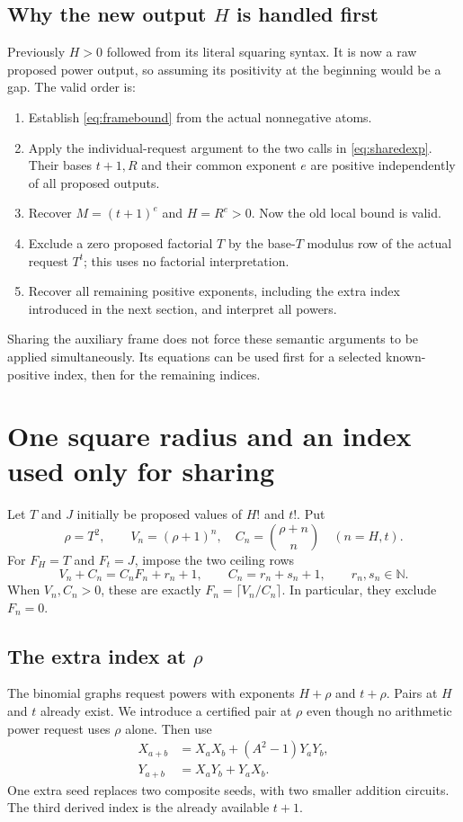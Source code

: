 \documentclass[11pt]{article}
\theoremstyle{definition}\newtheorem{definition}[theorem]{Definition}
\newcommand{\N}{\mathbb N}\newcommand{\Z}{\mathbb Z}\newcommand{\Q}{\mathbb Q}
\begin{document}
\subsection{Why the new output \texorpdfstring{$H$}{H} is handled first}
Previously $H>0$ followed from its literal squaring syntax. It is now a
raw proposed power output, so assuming its positivity at the beginning
would be a gap. The valid order is:
\begin{enumerate}
\item Establish \eqref{eq:framebound} from the actual nonnegative atoms.
\item Apply the individual-request argument to the two calls in
      \eqref{eq:sharedexp}. Their bases $t+1,R$ and their common exponent
      $e$ are positive independently of all proposed outputs.
\item Recover $M=(t+1)^e$ and $H=R^e>0$. Now the old local bound is valid.
\item Exclude a zero proposed factorial $T$ by the base-$T$ modulus row
      of the actual request $T^t$; this uses no factorial interpretation.
\item Recover all remaining positive exponents, including the extra
      index introduced in the next section, and interpret all powers.
\end{enumerate}
Sharing the auxiliary frame does not force these semantic arguments to be
applied simultaneously. Its equations can be used first for a selected
known-positive index, then for the remaining indices.

\section{One square radius and an index used only for sharing}
Let $T$ and $J$ initially be proposed values of $H!$ and $t!$. Put
\begin{equation}\label{eq:rho}
 \rho=T^2,\qquad
 V_n=(\rho+1)^n,\quad C_n=\binom{\rho+n}{n}\quad(n=H,t).
\end{equation}
For $F_H=T$ and $F_t=J$, impose the two ceiling rows
\begin{equation}\label{eq:ceiling}
 V_n+C_n=C_nF_n+r_n+1,\qquad C_n=r_n+s_n+1,
 \qquad r_n,s_n\in\N.
\end{equation}
When $V_n,C_n>0$, these are exactly
$F_n=\lceil V_n/C_n\rceil$. In particular, they exclude $F_n=0$.

\subsection{The extra index at \texorpdfstring{$\rho$}{rho}}
The binomial graphs request powers with exponents $H+\rho$ and
$t+\rho$. Pairs at $H$ and $t$ already exist. We introduce a certified
pair at $\rho$ even though no arithmetic power request uses $\rho$
alone. Then use
\begin{align}
 X_{a+b}&=X_aX_b+(A^2-1)Y_aY_b,\\
 Y_{a+b}&=X_aY_b+Y_aX_b.\label{eq:addition}
\end{align}
One extra seed replaces two composite seeds, with two smaller addition
circuits. The third derived index is the already available $t+1$.
\end{document}
